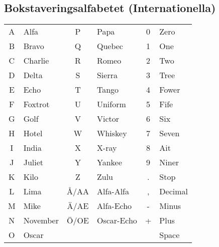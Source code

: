 \subsection{Bokstaveringsalfabetet (Internationella)}
\begin{center}
\begin{longtable}{cl|cl|cl}
	A & Alfa     &  P   & Papa       & 0 & Zero    \\
	B & Bravo    &  Q   & Quebec     & 1 & One     \\
	C & Charlie  &  R   & Romeo      & 2 & Two     \\
	D & Delta    &  S   & Sierra     & 3 & Tree    \\
	E & Echo     &  T   & Tango      & 4 & Fower   \\
	F & Foxtrot  &  U   & Uniform    & 5 & Fife    \\
	G & Golf     &  V   & Victor     & 6 & Six     \\
	H & Hotel    &  W   & Whiskey    & 7 & Seven   \\
	I & India    &  X   & X-ray      & 8 & Ait     \\
	J & Juliet   &  Y   & Yankee     & 9 & Niner   \\
	K & Kilo     &  Z   & Zulu       & . & Stop    \\
	L & Lima     & Å/AA & Alfa-Alfa  & , & Decimal \\
	M & Mike     & Ä/AE & Alfa-Echo  & - & Minus   \\
	N & November & Ö/OE & Oscar-Echo & + & Plus    \\
	O & Oscar    &      &            &   & Space   \\
\end{longtable}
\end{center}

